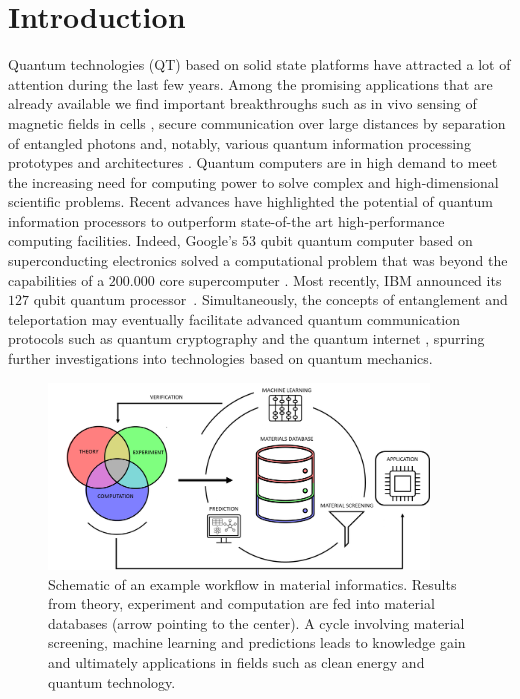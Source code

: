 \documentclass[superscriptaddress,unsortedaddress,
 amsmath,amssymb,
 aps,
]{revtex4-2}
\begin{document}
\section*{Introduction}
Quantum technologies (QT) based on solid state platforms have attracted a lot of attention during the last few years. 
Among the promising applications that are already available we find important breakthroughs such as in vivo sensing of magnetic fields in cells \cite{Lesage_2013}, secure communication over large distances by separation of entangled photons \cite{Ursin2007} and, notably, various quantum information processing prototypes and architectures \cite{Arute_2019}.  
Quantum computers are in high demand to meet the increasing need for computing power to solve complex and high-dimensional scientific problems. 
Recent advances have highlighted the potential of quantum information processors to outperform state-of-the art high-performance computing facilities. Indeed, Google's $53$ qubit quantum computer based on superconducting electronics solved a computational problem that was beyond the capabilities of a $200.000$ core supercomputer \cite{Arute_2019}. Most recently, IBM announced its $127$ qubit quantum processor~\cite{IBM2021}. Simultaneously, the concepts of entanglement and teleportation may eventually facilitate advanced quantum communication protocols such as quantum cryptography and the quantum internet \cite{quantum-internet-kimble}, spurring further investigations into technologies based on quantum mechanics.

\begin{figure}[t]
    \centering
    \includegraphics[width=0.9\textwidth]{figures/ht-workflow-new-2.png}
    \caption{Schematic of an example workflow in material informatics. Results from theory, experiment and computation are fed into material databases (arrow pointing to the center). A cycle involving material screening, machine learning and predictions leads to knowledge gain and ultimately applications in fields such as clean energy and quantum technology. 
    }
    \label{fig:ht-workflow}
\end{figure}
\end{document}
